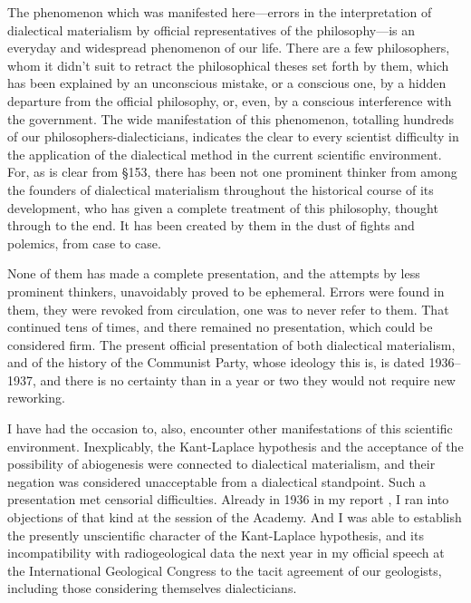 The phenomenon which was manifested here---errors in the interpretation of
dialectical materialism by official representatives of the philosophy---is an
everyday and widespread phenomenon of our life.  There are a few philosophers,
whom it didn't suit to retract the philosophical theses set forth by them,
which has been explained by an unconscious mistake, or a conscious one, by a
hidden departure from the official philosophy, or, even, by a conscious
interference with the government.  The wide manifestation of this phenomenon,
totalling hundreds of our philosophers-dialecticians, indicates the clear to
every scientist difficulty in the application of the dialectical method in the
current scientific environment.  For, as is clear from §153, there has been not
one prominent thinker from among the founders of dialectical materialism
throughout the historical course of its development, who has given a complete
treatment of this philosophy, thought through to the end.  It has been created
by them in the dust of fights and polemics, from case to case.

None of them has made a complete presentation, and the attempts by less
prominent thinkers, unavoidably proved to be ephemeral.  Errors were found in
them, they were revoked from circulation, one was to never refer to them.  That
continued tens of times, and there remained no presentation, which could be
considered firm.  The present official presentation of both dialectical
materialism, and of the history of the Communist Party, whose ideology this is,
is dated 1936--1937, and there is no certainty than in a year or two they would
not require new reworking.

I have had the occasion to, also, encounter other manifestations of this
scientific environment.  Inexplicably, the Kant-Laplace hypothesis and the
acceptance of the possibility of abiogenesis were connected to dialectical
materialism, and their negation was considered unacceptable from a dialectical
standpoint.  Such a presentation met censorial difficulties.  Already in 1936
in my report , I ran into objections
of that kind at the session of the Academy.  And I was able to establish the
presently unscientific character of the Kant-Laplace hypothesis, and its
incompatibility with radiogeological data the next year in my official speech
at the International Geological Congress to the tacit agreement of our geologists, including
those considering themselves dialecticians.

